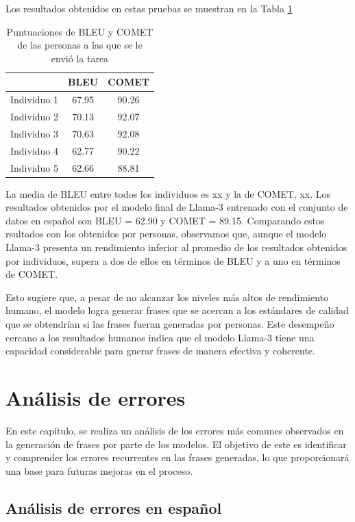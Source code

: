 \documentclass[11pt,spanish,listoffigures,listoftables]{tfgetsinf}
\begin{document}
Los resultados obtenidos en estas pruebas se muestran en la Tabla \ref{tab:experimentosPersonas}
\begin{table}[!h]
\caption{Puntuaciones de BLEU y COMET de las personas a las que se le envió la tarea}
\begin{center}
\begin{tabular}{ c | c c }
	\ & BLEU & COMET \\
	\hline
	\hline
	Individuo 1 & 67.95 & 90.26  \\
	Individuo 2 & 70.13 & 92.07\\
	Individuo 3 & 70.63 & 92.08 \\
	Individuo 4 & 62.77 & 90.22 \\
	Individuo 5 & 62.66 & 88.81 \\

\end{tabular}
\end{center}
\label{tab:experimentosPersonas}
\end{table}

La media de BLEU entre todos los individuos es xx y la de COMET, xx. Los resultados obtenidos por el modelo final de Llama-3 entrenado con el conjunto de datos en español son BLEU = 62.90 y COMET = 89.15. Comparando estos rsultados con los obtenidos por personas, observamos que, aunque el modelo Llama-3 presenta un rendimiento inferior al promedio de los resultados obtenidos por individuos, supera a dos de ellos en términos de BLEU y a uno en términos de COMET.

Esto sugiere que, a pesar de no alcanzar los niveles más altos de rendimiento humano, el modelo logra generar frases que se acercan a los estándares de calidad que se obtendrían si las frases fueran generadas por personas. Este desempeño cercano a los resultados humanos indica que el modelo Llama-3 tiene una capacidad considerable para gnerar frases de manera efectiva y coherente.

\chapter{Análisis de errores}

En este capítulo, se realiza un análisis de los errores más comunes observados en la generación de frases por parte de los modelos. El objetivo de este es identificar y comprender los errores recurrentes en las frases generadas, lo que proporcionará una base para futuras mejoras en el proceso.

\section{Análisis de errores en español}
\end{document}
